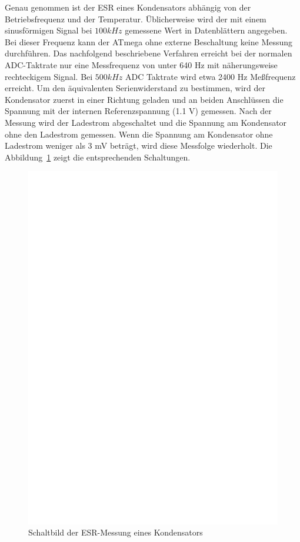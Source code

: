 Genau genommen ist der ESR eines Kondensators abhängig von der Betriebsfrequenz und der Temperatur.
Üblicherweise wird der mit einem sinusförmigen Signal bei \(100 kHz\) gemessene Wert in Datenblättern angegeben.
Bei dieser Frequenz kann der ATmega ohne externe Beschaltung keine Messung durchführen.
Das nachfolgend beschriebene Verfahren erreicht bei der normalen ADC-Taktrate nur eine Messfrequenz von unter 640 Hz
 mit näherungsweise rechteckigem Signal. Bei \(500 kHz\) ADC Taktrate wird etwa 2400 Hz Meßfrequenz erreicht.
Um den äquivalenten Serienwiderstand zu bestimmen,
 wird der Kondensator zuerst in einer Richtung geladen und an beiden Anschlüssen die Spannung mit der internen
Referenzspannung (1.1 V) gemessen.
Nach der Messung wird der Ladestrom abgeschaltet und die Spannung am Kondensator ohne den
Ladestrom gemessen. Wenn die Spannung am Kondensator ohne Ladestrom weniger als 3 mV beträgt, wird
diese Messfolge wiederholt.
Die Abbildung~\ref{fig:Cap_esr} zeigt die entsprechenden Schaltungen.

\begin{figure}[H]
  \centering
    \includegraphics[]{../FIG/Cap_esr.eps}
  \caption{Schaltbild der ESR-Messung eines Kondensators}
  \label{fig:Cap_esr}
\end{figure}

